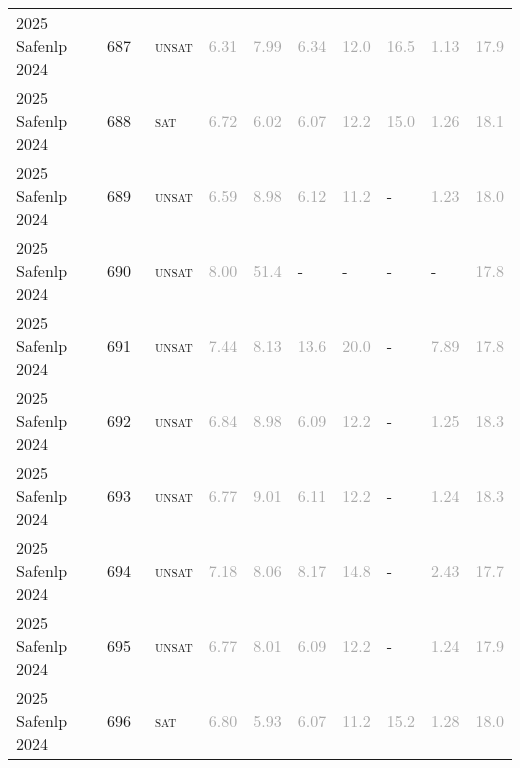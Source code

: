 \begin{center}
{\begin{longtable}{@{}llllllllll@{}}
2025 Safenlp 2024 & 687 & ~\textsc{unsat} & \textcolor{darkgray}{6.31} & \textcolor{darkgray}{7.99} & \textcolor{darkgray}{6.34} & \textcolor{darkgray}{12.0} & \textcolor{darkgray}{16.5} & \textcolor{darkgray}{1.13} & \textcolor{darkgray}{17.9} \\
2025 Safenlp 2024 & 688 & ~\textsc{sat} & \textcolor{darkgray}{6.72} & \textcolor{darkgray}{6.02} & \textcolor{darkgray}{6.07} & \textcolor{darkgray}{12.2} & \textcolor{darkgray}{15.0} & \textcolor{darkgray}{1.26} & \textcolor{darkgray}{18.1} \\
2025 Safenlp 2024 & 689 & ~\textsc{unsat} & \textcolor{darkgray}{6.59} & \textcolor{darkgray}{8.98} & \textcolor{darkgray}{6.12} & \textcolor{darkgray}{11.2} & - & \textcolor{darkgray}{1.23} & \textcolor{darkgray}{18.0} \\
2025 Safenlp 2024 & 690 & ~\textsc{unsat} & \textcolor{darkgray}{8.00} & \textcolor{darkgray}{51.4} & - & - & - & - & \textcolor{darkgray}{17.8} \\
2025 Safenlp 2024 & 691 & ~\textsc{unsat} & \textcolor{darkgray}{7.44} & \textcolor{darkgray}{8.13} & \textcolor{darkgray}{13.6} & \textcolor{darkgray}{20.0} & - & \textcolor{darkgray}{7.89} & \textcolor{darkgray}{17.8} \\
2025 Safenlp 2024 & 692 & ~\textsc{unsat} & \textcolor{darkgray}{6.84} & \textcolor{darkgray}{8.98} & \textcolor{darkgray}{6.09} & \textcolor{darkgray}{12.2} & - & \textcolor{darkgray}{1.25} & \textcolor{darkgray}{18.3} \\
2025 Safenlp 2024 & 693 & ~\textsc{unsat} & \textcolor{darkgray}{6.77} & \textcolor{darkgray}{9.01} & \textcolor{darkgray}{6.11} & \textcolor{darkgray}{12.2} & - & \textcolor{darkgray}{1.24} & \textcolor{darkgray}{18.3} \\
2025 Safenlp 2024 & 694 & ~\textsc{unsat} & \textcolor{darkgray}{7.18} & \textcolor{darkgray}{8.06} & \textcolor{darkgray}{8.17} & \textcolor{darkgray}{14.8} & - & \textcolor{darkgray}{2.43} & \textcolor{darkgray}{17.7} \\
2025 Safenlp 2024 & 695 & ~\textsc{unsat} & \textcolor{darkgray}{6.77} & \textcolor{darkgray}{8.01} & \textcolor{darkgray}{6.09} & \textcolor{darkgray}{12.2} & - & \textcolor{darkgray}{1.24} & \textcolor{darkgray}{17.9} \\
2025 Safenlp 2024 & 696 & ~\textsc{sat} & \textcolor{darkgray}{6.80} & \textcolor{darkgray}{5.93} & \textcolor{darkgray}{6.07} & \textcolor{darkgray}{11.2} & \textcolor{darkgray}{15.2} & \textcolor{darkgray}{1.28} & \textcolor{darkgray}{18.0} \\

\end{longtable}}
\end{center}

